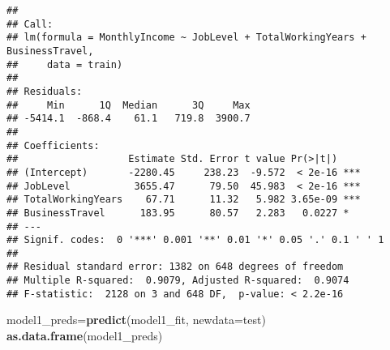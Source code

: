 \documentclass[]{article}
\newenvironment{Shaded}{\begin{snugshade}}{\end{snugshade}}
\newcommand{\DataTypeTok}[1]{\textcolor[rgb]{0.13,0.29,0.53}{#1}}
\newcommand{\KeywordTok}[1]{\textcolor[rgb]{0.13,0.29,0.53}{\textbf{#1}}}
\newcommand{\NormalTok}[1]{#1}
\begin{document}
\begin{verbatim}
## 
## Call:
## lm(formula = MonthlyIncome ~ JobLevel + TotalWorkingYears + BusinessTravel, 
##     data = train)
## 
## Residuals:
##     Min      1Q  Median      3Q     Max 
## -5414.1  -868.4    61.1   719.8  3900.7 
## 
## Coefficients:
##                   Estimate Std. Error t value Pr(>|t|)    
## (Intercept)       -2280.45     238.23  -9.572  < 2e-16 ***
## JobLevel           3655.47      79.50  45.983  < 2e-16 ***
## TotalWorkingYears    67.71      11.32   5.982 3.65e-09 ***
## BusinessTravel      183.95      80.57   2.283   0.0227 *  
## ---
## Signif. codes:  0 '***' 0.001 '**' 0.01 '*' 0.05 '.' 0.1 ' ' 1
## 
## Residual standard error: 1382 on 648 degrees of freedom
## Multiple R-squared:  0.9079, Adjusted R-squared:  0.9074 
## F-statistic:  2128 on 3 and 648 DF,  p-value: < 2.2e-16
\end{verbatim}

\begin{Shaded}
\begin{Highlighting}[]
\NormalTok{model1_preds=}\KeywordTok{predict}\NormalTok{(model1_fit, }\DataTypeTok{newdata=}\NormalTok{test)}
\KeywordTok{as.data.frame}\NormalTok{(model1_preds)}
\end{Highlighting}
\end{Shaded}
\end{document}

